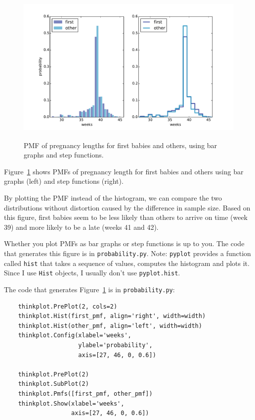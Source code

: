 \documentclass[12pt]{book}
\begin{document}
\begin{figure}
\centerline{\includegraphics[height=3.0in]{figs/probability_nsfg_pmf.pdf}}
\caption{PMF of pregnancy lengths for first babies and others, using
  bar graphs and step functions.}
\label{probability_nsfg_pmf}
\end{figure}

Figure~\ref{probability_nsfg_pmf} shows PMFs of pregnancy length for
first babies and others using bar graphs (left) and step functions
(right).

By plotting the PMF instead of the histogram, we can compare the two
distributions without distortion caused by the difference in sample
size.  Based on this figure, first babies seem to be less likely than
others to arrive on time (week 39) and more likely to be a late (weeks
41 and 42).

Whether you plot PMFs as bar graphs or step functions is up to you.
The code that generates this figure is in {\tt probability.py}.
Note: {\tt pyplot} provides a function called {\tt hist} that
takes a sequence of values, computes the histogram and plots it.
Since I use {\tt Hist} objects, I usually don't use {\tt pyplot.hist}.

The code that generates Figure~\ref{probability_nsfg_pmf} is in
{\tt probability.py}:

\begin{verbatim}
    thinkplot.PrePlot(2, cols=2)
    thinkplot.Hist(first_pmf, align='right', width=width)
    thinkplot.Hist(other_pmf, align='left', width=width)
    thinkplot.Config(xlabel='weeks',
                     ylabel='probability',
                     axis=[27, 46, 0, 0.6])

    thinkplot.PrePlot(2)
    thinkplot.SubPlot(2)
    thinkplot.Pmfs([first_pmf, other_pmf])
    thinkplot.Show(xlabel='weeks',
                   axis=[27, 46, 0, 0.6])
\end{verbatim}
\end{document}

